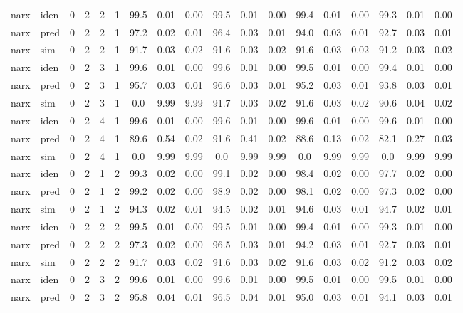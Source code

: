 \begin{landscape}
\begin{center}
\begin{longtable}{ll|cccc|ccc|ccc|ccc|ccc}
 \hline 
narx & iden & 0 & 2 & 2 & 1 & 99.5 & 0.01 & 0.00 & 99.5 & 0.01 & 0.00 & 99.4 & 0.01 & 0.00 & 99.3 & 0.01 & 0.00 \\ 
narx & pred & 0 & 2 & 2 & 1 & 97.2 & 0.02 & 0.01 & 96.4 & 0.03 & 0.01 & 94.0 & 0.03 & 0.01 & 92.7 & 0.03 & 0.01 \\ 
narx & sim  & 0 & 2 & 2 & 1 & 91.7 & 0.03 & 0.02 & 91.6 & 0.03 & 0.02 & 91.6 & 0.03 & 0.02 & 91.2 & 0.03 & 0.02 \\ 
 \hline 
narx & iden & 0 & 2 & 3 & 1 & 99.6 & 0.01 & 0.00 & 99.6 & 0.01 & 0.00 & 99.5 & 0.01 & 0.00 & 99.4 & 0.01 & 0.00 \\ 
narx & pred & 0 & 2 & 3 & 1 & 95.7 & 0.03 & 0.01 & 96.6 & 0.03 & 0.01 & 95.2 & 0.03 & 0.01 & 93.8 & 0.03 & 0.01 \\ 
narx & sim  & 0 & 2 & 3 & 1 & 0.0 & 9.99 & 9.99 & 91.7 & 0.03 & 0.02 & 91.6 & 0.03 & 0.02 & 90.6 & 0.04 & 0.02 \\ 
 \hline 
narx & iden & 0 & 2 & 4 & 1 & 99.6 & 0.01 & 0.00 & 99.6 & 0.01 & 0.00 & 99.6 & 0.01 & 0.00 & 99.6 & 0.01 & 0.00 \\ 
narx & pred & 0 & 2 & 4 & 1 & 89.6 & 0.54 & 0.02 & 91.6 & 0.41 & 0.02 & 88.6 & 0.13 & 0.02 & 82.1 & 0.27 & 0.03 \\ 
narx & sim  & 0 & 2 & 4 & 1 & 0.0 & 9.99 & 9.99 & 0.0 & 9.99 & 9.99 & 0.0 & 9.99 & 9.99 & 0.0 & 9.99 & 9.99 \\ 
 \hline 
narx & iden & 0 & 2 & 1 & 2 & 99.3 & 0.02 & 0.00 & 99.1 & 0.02 & 0.00 & 98.4 & 0.02 & 0.00 & 97.7 & 0.02 & 0.00 \\ 
narx & pred & 0 & 2 & 1 & 2 & 99.2 & 0.02 & 0.00 & 98.9 & 0.02 & 0.00 & 98.1 & 0.02 & 0.00 & 97.3 & 0.02 & 0.00 \\ 
narx & sim  & 0 & 2 & 1 & 2 & 94.3 & 0.02 & 0.01 & 94.5 & 0.02 & 0.01 & 94.6 & 0.03 & 0.01 & 94.7 & 0.02 & 0.01 \\ 
 \hline 
narx & iden & 0 & 2 & 2 & 2 & 99.5 & 0.01 & 0.00 & 99.5 & 0.01 & 0.00 & 99.4 & 0.01 & 0.00 & 99.3 & 0.01 & 0.00 \\ 
narx & pred & 0 & 2 & 2 & 2 & 97.3 & 0.02 & 0.00 & 96.5 & 0.03 & 0.01 & 94.2 & 0.03 & 0.01 & 92.7 & 0.03 & 0.01 \\ 
narx & sim  & 0 & 2 & 2 & 2 & 91.7 & 0.03 & 0.02 & 91.6 & 0.03 & 0.02 & 91.6 & 0.03 & 0.02 & 91.2 & 0.03 & 0.02 \\ 
 \hline 
narx & iden & 0 & 2 & 3 & 2 & 99.6 & 0.01 & 0.00 & 99.6 & 0.01 & 0.00 & 99.5 & 0.01 & 0.00 & 99.5 & 0.01 & 0.00 \\ 
narx & pred & 0 & 2 & 3 & 2 & 95.8 & 0.04 & 0.01 & 96.5 & 0.04 & 0.01 & 95.0 & 0.03 & 0.01 & 94.1 & 0.03 & 0.01 \\ 

\end{longtable}
\end{center}
\end{landscape}
